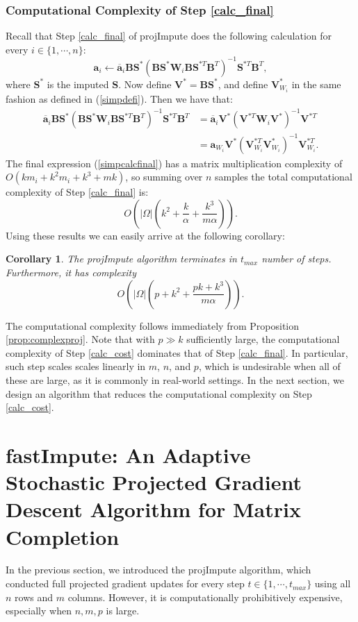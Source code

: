 \documentclass[twoside,11pt]{article}
\newtheorem{cor}{Corollary}
\begin{document}
\subsubsection*{Computational Complexity of Step \ref{calc_final}}
Recall that Step \ref{calc_final} of projImpute does the following calculation for every $i \in \{1,\cdots,n\}$:
\begin{equation}
    \bm{a}_i \leftarrow \overline{\bm{a}}_i\bm{B}\bm{S}^{*}(\bm{B}\bm{S}^{*}\bm{W}_i\bm{B}\bm{S}^{*T}\bm{B}^T)^{-1}\bm{S}^{*T}\bm{B}^T,
\end{equation}
where $\bm{S}^*$ is the imputed $\bm{S}$. Now define $\bm{V}^*=\bm{B}\bm{S}^{*}$, and define $\bm{V}^*_{W_i}$ in the same fashion as defined in (\ref{simpdefi}). Then we have that:
\begin{align}
    \overline{\bm{a}}_i\bm{B}\bm{S}^{*}(\bm{B}\bm{S}^{*}\bm{W}_i\bm{B}\bm{S}^{*T}\bm{B}^T)^{-1}\bm{S}^{*T}\bm{B}^T&=\overline{\bm{a}}_i\bm{V}^{*}(\bm{V}^{*T}\bm{W}_i\bm{V}^{*})^{-1}\bm{V}^{*T}\nonumber\\&=\bm{a}_{W_i}\bm{V}^{*}(\bm{V}^{*T}_{W_i}\bm{V}^{*}_{W_i})^{-1}\bm{V}^{*T}_{W_i} .\label{simpcalcfinal}
\end{align}
The final expression (\ref{simpcalcfinal}) has a matrix multiplication complexity of $O(km_i+k^2m_i+k^3+mk)$, so summing over $n$ samples the total computational complexity of Step \ref{calc_final} is:
$$O\left(|\Omega|\left(k^2+\frac{k}{\alpha}+\frac{k^3}{m\alpha}\right)\right).$$
\endproof
Using these results we can easily arrive at the following corollary:
\begin{cor}
The projImpute algorithm terminates in $t_{max}$ number of steps. Furthermore, it has complexity $$O\left(|\Omega| \left(p+k^2+\frac{pk+k^3}{m\alpha}\right)\right).$$
\end{cor}
\proof
The computational complexity follows immediately from Proposition \ref{prop:complexproj}.
\endproof
Note that with $p\gg k$ sufficiently large, the computational complexity of Step \ref{calc_cost} dominates that of Step \ref{calc_final}. In particular, such step scales scales linearly in $m$, $n$, and $p$, which is undesirable when all of these are large, as it is commonly in real-world settings. In the next section, we  design an algorithm that reduces the computational complexity on Step \ref{calc_cost}. 
\section{fastImpute: An Adaptive Stochastic Projected Gradient Descent Algorithm for Matrix Completion}
\label{sec:mc_pgdside}
In the previous section, we introduced  the projImpute algorithm, which conducted full projected gradient updates for every step $t \in \{1,\cdots, t_{max}\}$ using all $n$ rows and $m$ columns. However, it is computationally prohibitively expensive, especially when $n,m,p$ is large. 
\end{document}
